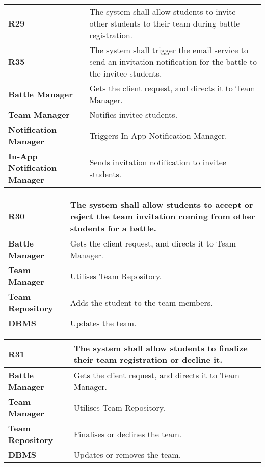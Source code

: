 \begin{table}[h!]
  \centering
  \begin{tabular}{lp{12cm}}
    \hline
    \textbf{R29} &  The system shall allow students to invite other students to their team during battle registration. \\
    \textbf{R35} &  The system shall trigger the email service to send an invitation notification for the battle to the invitee students. \\
    \hline
    \hline
    \textbf{Battle Manager} & Gets the client request, and directs it to Team Manager. \\
    \textbf{Team Manager} & Notifies invitee students.\\
    \textbf{Notification Manager} &  Triggers In-App Notification Manager.\\
    \textbf{In-App Notification Manager} &  Sends invitation notification to invitee students.\\
    \hline
  \end{tabular}
\end{table}

\begin{table}[h!]
  \centering
  \begin{tabular}{lp{12cm}}
    \hline
    \textbf{R30} &  The system shall allow students to accept or reject the team invitation coming from other students for a battle. \\
    \hline
    \hline
    \textbf{Battle Manager} & Gets the client request, and directs it to Team Manager. \\
    \textbf{Team Manager} & Utilises Team Repository.\\
    \textbf{Team Repository} & Adds the student to the team members.\\
    \textbf{DBMS} & Updates the team. \\
    \hline
  \end{tabular}
\end{table}


\begin{table}[h!]
  \centering
  \begin{tabular}{lp{12cm}}
    \hline
    \textbf{R31} &  The system shall allow students to finalize their team registration or decline it. \\
    \hline
    \hline
    \textbf{Battle Manager} & Gets the client request, and directs it to Team Manager. \\
    \textbf{Team Manager} & Utilises Team Repository.\\
    \textbf{Team Repository} & Finalises or declines the team.\\
    \textbf{DBMS} & Updates or removes the team. \\
    \hline
  \end{tabular}
\end{table}


